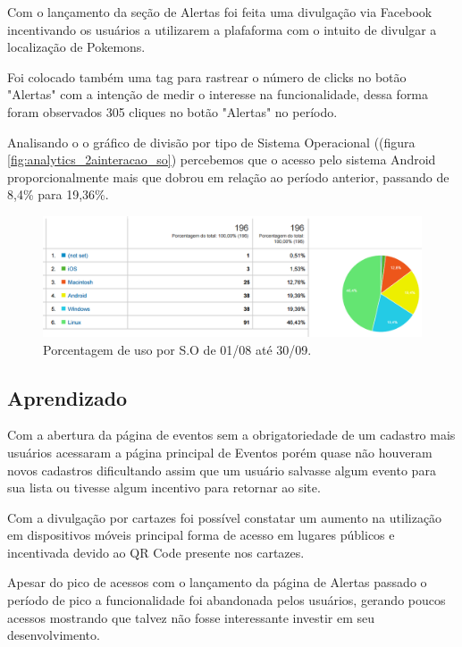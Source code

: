 \par Com o lançamento da seção de Alertas foi feita uma divulgação via Facebook incentivando os usuários a utilizarem a plafaforma com o intuito de divulgar a localização de Pokemons.
\par Foi colocado também uma tag para rastrear o número de clicks no botão "Alertas" com a intenção de medir o interesse na funcionalidade, dessa forma foram observados 305 cliques no botão "Alertas" no período.

\par Analisando o o gráfico de divisão por tipo de Sistema Operacional ((figura \ref{fig:analytics_2ainteracao_so}) percebemos que o acesso pelo sistema Android proporcionalmente mais que dobrou em relação ao período anterior, passando de 8,4\% para 19,36\%.

\begin{figure}[htb]
\includegraphics[width=15cm]{figuras/analytics_2ainteracao_so}
\caption{\label{fig:analytics_1interacao_so} Porcentagem de uso por S.O de 01/08 até 30/09.}
\end{figure}

\subsection{Aprendizado}

\par Com a abertura da página de eventos sem a obrigatoriedade de um cadastro mais usuários acessaram a página principal de Eventos porém quase não houveram novos cadastros dificultando assim que um usuário salvasse algum evento para sua lista ou tivesse algum incentivo para retornar ao site.

\par Com a divulgação por cartazes foi possível constatar um aumento na utilização em dispositivos móveis principal forma de acesso em lugares públicos e incentivada devido ao QR Code presente nos cartazes.

\par Apesar do pico de acessos com o lançamento da página de Alertas passado o período de pico a funcionalidade foi abandonada pelos usuários, gerando poucos acessos mostrando que talvez não fosse interessante investir em seu desenvolvimento.

